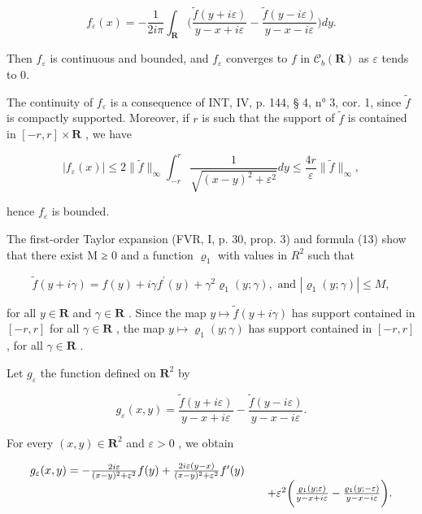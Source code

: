 \[
f _ {\varepsilon} (x) = - \frac {1}{2 i \pi} \int_ {\mathbf {R}} \biggl (\frac {\widetilde {f} (y + i \varepsilon)}{y - x + i \varepsilon} - \frac {\widetilde {f} (y - i \varepsilon)}{y - x - i \varepsilon} \biggr) d y.
\]

Then \(f_{\varepsilon}\) is continuous and bounded, and \(f_{\varepsilon}\) converges to \(f\) in \(\mathcal{C}_b(\mathbf{R})\) as \(\varepsilon\) tends to 0.

The continuity of \(f_{\varepsilon}\) is a consequence of INT, IV, p. 144, § 4, n° 3, cor. 1, since \(\widetilde{f}\) is compactly supported. Moreover, if \(r\) is such that the support of \(\widetilde{f}\) is contained in \([-r, r] \times \mathbf{R}\) , we have

\[
| f _ {\varepsilon} (x) | \leqslant 2 \| \widetilde {f} \| _ {\infty} \int_ {- r} ^ {r} \frac {1}{\sqrt {(x - y) ^ {2} + \varepsilon^ {2}}} d y \leqslant \frac {4 r}{\varepsilon} \| \widetilde {f} \| _ {\infty},
\]

hence \(f_{\varepsilon}\) is bounded.

The first-order Taylor expansion (FVR, I, p. 30, prop. 3) and formula (13) show that there exist M ≥ 0 and a function \(\varrho_{1}\) with values in \(R^{2}\) such that

\[
\widetilde {f} (y + i \gamma) = f (y) + i \gamma f ^ {\prime} (y) + \gamma^ {2} \varrho_ {1} (y; \gamma), \text {   and   } | \varrho_ {1} (y; \gamma) | \leqslant M,
\]

for all \(y \in \mathbf{R}\) and \(\gamma \in \mathbf{R}\) . Since the map \(y \mapsto \widetilde{f}(y + i\gamma)\) has support contained in \([-r, r]\) for all \(\gamma \in \mathbf{R}\) , the map \(y \mapsto \varrho_{1}(y; \gamma)\) has support contained in \([-r, r]\) , for all \(\gamma \in \mathbf{R}\) .

Let \(g_{\varepsilon}\) the function defined on \(\mathbf{R}^2\) by

\[
g _ {\varepsilon} (x, y) = \frac {\widetilde {f} (y + i \varepsilon)}{y - x + i \varepsilon} - \frac {\widetilde {f} (y - i \varepsilon)}{y - x - i \varepsilon}.
\]

For every \((x,y)\in \mathbf{R}^2\) and \(\varepsilon >0\) , we obtain

\[
\begin{array}{r l} g _ {\varepsilon} (x, y) = - \frac {2 i \varepsilon}{(x - y) ^ {2} + \varepsilon^ {2}} f (y) + \frac {2 i \varepsilon (y - x)}{(x - y) ^ {2} + \varepsilon^ {2}} f ^ {\prime} (y) \\ & \quad + \varepsilon^ {2} \bigg (\frac {\varrho_ {1} (y ; \varepsilon)}{y - x + i \varepsilon} - \frac {\varrho_ {1} (y ; - \varepsilon)}{y - x - i \varepsilon} \bigg). \end{array}
\]

